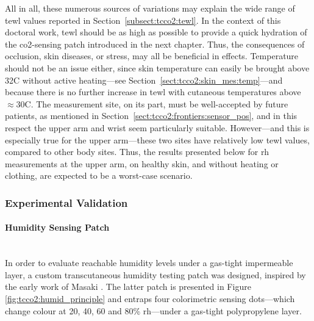 All in all, these numerous sources of variations may explain the wide range of \gls{tewl} values reported in Section~\ref{subsect:tcco2:tewl}. In the context of this doctoral work, \gls{tewl} should be as high as possible to provide a quick hydration of the \gls{co2}-sensing patch introduced in the next chapter. Thus, the consequences of occlusion, skin diseases, or stress, may all be beneficial in effects. Temperature should not be an issue either, since skin temperature can easily be brought above 32{\degree}C without active heating---see Section~\ref{sect:tcco2:skin_mes:temp}---and because there is no further increase in \gls{tewl} with cutaneous temperatures above $\approx$30{\degree}C\cite{rogiers1995}. The measurement site, on its part, must be well-accepted by future patients, as mentioned in Section~\ref{sect:tcco2:frontiers:sensor_pos}, and in this respect the upper arm and wrist seem particularly suitable. However---and this is especially true for the upper arm---these two sites have relatively low \gls{tewl} values, compared to other body sites\cite{kottner2013, akdeniz2018}. Thus, the results presented below for \gls{rh} measurements at the upper arm, on healthy skin, and without heating or clothing, are expected to be a worst-case scenario.

\subsubsection{Experimental Validation}

\paragraph{Humidity Sensing Patch}\label{subsect:tcco2:skin_mes:rh:patch_description}\mbox{}\\

In order to evaluate reachable humidity levels under a gas-tight impermeable layer, a custom transcutaneous humidity testing patch was designed, inspired by the early work of Masaki \etal{}\cite{masaki1986}. The latter patch is presented in Figure \ref{fig:tcco2:humid_principle} and entraps four colorimetric sensing dots---which change colour at 20, 40, 60 and 80\% \gls{rh}---under a gas-tight polypropylene layer.

